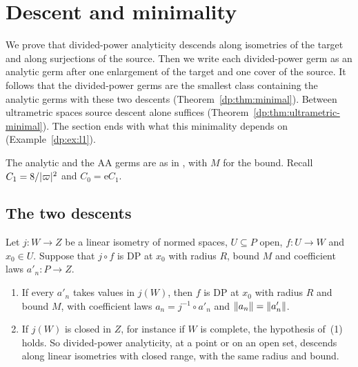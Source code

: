\section{Descent and minimality}\label{dp:sec:descent}

We prove that divided-power analyticity descends along isometries of the target and along surjections of the source. Then we write each divided-power germ as an analytic germ after one enlargement of the target and one cover of the source. It follows that the divided-power germs are the smallest class containing the analytic germs with these two descents (Theorem~\ref{dp:thm:minimal}). Between ultrametric spaces source descent alone suffices (Theorem~\ref{dp:thm:ultrametric-minimal}). The section ends with what this minimality depends on (Example~\ref{dp:ex:l1}).

The analytic and the AA germs are as in \cite[Definition~14.7]{I}, with $M$ for the bound. Recall $C_1=8/\lvert \varpi\rvert^2$ and $C_0=\mathrm eC_1$.

\subsection{The two descents}\label{dp:ssec:two-descents}

\begin{theorem}\label{dp:thm:target-descent}
Let $j\colon W\to Z$ be a linear isometry of normed spaces, $U\subseteq P$ open, $f\colon U\to W$ and $x_0\in U$. Suppose that $j\circ f$ is DP at $x_0$ with radius $R$, bound $M$ and coefficient laws $a'_n\colon P\to Z$.
\begin{enumerate}
\item If every $a'_n$ takes values in $j(W)$, then $f$ is DP at $x_0$ with radius $R$ and bound $M$, with coefficient laws $a_n=j^{-1}\circ a'_n$ and $\lVert a_n\rVert=\lVert a'_n\rVert$.
\item If $j(W)$ is closed in $Z$, for instance if $W$ is complete, the hypothesis of~(1) holds. So divided-power analyticity, at a point or on an open set, descends along linear isometries with closed range, with the same radius and bound.
\end{enumerate}
\end{theorem}

